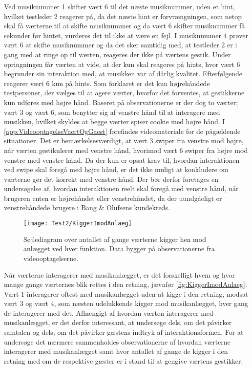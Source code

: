 Ved musiknummer 1 skifter vært 6 til det næste musiknummer, uden et hint, hvilket testleder 2 reagerer på, da det næste hint er forvrængningen, som netop skal få værterne til at skifte musiknummer og da vært 6 skifter musiknummer få sekunder før hintet, vurderes det til ikke at være en fejl. I musiknummer 4 prøver vært 6 at skifte musiknummer og da det sker samtidig med, at testleder 2 er i gang med at ringe op til værten, reageres der ikke på værtens gestik. Under opringningen får værten at vide, at der kun skal reageres på hints, hvor vært 6 begrunder sin interaktion med, at musikken var af dårlig kvalitet. Efterfølgende reagerer vært 6 kun på hints.\blankline
%
Som forklaret er det kun højrehåndede testpersoner, der vælges til at agere værter, hvorfor det forventes, at gestikkerne kun udføres med højre hånd. Baseret på observationerne er der dog to værter; vært 3 og vært 6, som benytter sig af venstre hånd til at interagere med musikken, hvilket skyldes at begge værter spiser cookie med højre hånd. I \autoref{app:VideooptagelseVaertOgGaest} forefindes videomateriale for de pågældende situationer. Det er bemærkelsesværdigt, at vært 3 swiper fra venstre mod højre, når værten gestikulerer med venstre hånd, hvorimod vært 6 swiper fra højre mod venstre med venstre hånd. Da der kun er opsat krav til, hvordan interaktionen ved swipe skal foregå med højre hånd, er det ikke muligt at konkludere om værterne gør det korrekt med venstre hånd. Der bør derfor foretages en undersøgelse af, hvordan interaktionen reelt skal foregå med venstre hånd, når brugeren enten er højrehåndet eller venstrehåndet, da der uundgåeligt er venstrehåndede brugere i Bang $\&$ Olufsens kundekreds.     
%
\begin{figure}[H]
	\centering
	\texttt{[image: Test2/KiggerImodAnlaeg]}
	\caption{Søjlediagram over antallet af gange værterne kigger hen mod anlægget ved hver funktion. Data bygger på observationerne fra videooptagelserne.}
	\label{fig:KiggerImodAnlaeg}
\end{figure}
\noindent
% 
Når værterne interagerer med musikanlægget, er det forskelligt hvem og hvor mange gange værternes blik rettes i den retning, jævnfør \autoref{fig:KiggerImodAnlaeg}. Vært 1 interagerer oftest med musikanlægget uden at kigge i den retning, modsat vært 3 og vært 4, som næsten udelukkende kigger mod musikanlægget, hver gang de interagerer med det. Afhængigt af hvordan værten interagerer med musikanlægget, er det derfor interessant, at undersøge dels, om det påvirker samtalen og dels, om det påvirker gæstens indtryk af interaktionsformen. For at undersøge det nærmere sammenholdes observationerne af hvordan værterne interagerer med musikanlægget samt hvor antallet af gange de kigger i den retning med om de respektive gæster er i stand til at gengive værtens gestikker. 

